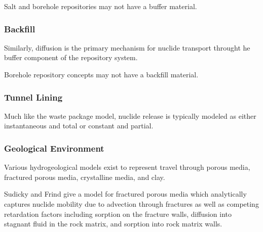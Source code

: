 Salt and borehole repositories may not have a buffer material.

\subsubsection{Backfill}
Similarly, diffusion is the primary mechanism for nuclide transport 
throught he buffer component of the repository system.

Borehole repository concepts may not have a backfill material. 

\subsubsection{Tunnel Lining}
Much like the waste package model, nuclide release is typically 
modeled as either instantaneous and total or constant and partial. 

\subsubsection{Geological Environment}
Various hydrogeological models exist to represent travel through 
porous media, fractured porous media, crystalline media, and clay.

Sudicky and Frind give a model for fractured porous media which 
analytically captures nuclide mobility due to advection through 
fractures as well as competing retardation factors including sorption on the 
fracture walls, diffusion into stagnant fluid in the rock matrix, and 
sorption into rock matrix walls. 
